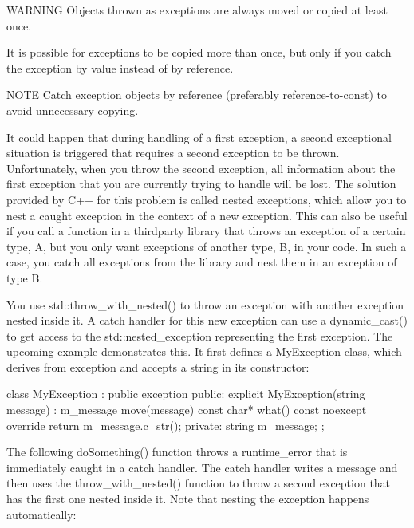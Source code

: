 \begin{myWarning}{WARNING}
Objects thrown as exceptions are always moved or copied at least once.
\end{myWarning}

It is possible for exceptions to be copied more than once, but only if you catch the exception by value instead of by reference.

\begin{myNotic}{NOTE}
Catch exception objects by reference (preferably reference-to-const) to avoid unnecessary copying.
\end{myNotic}



It could happen that during handling of a first exception, a second exceptional situation is triggered that requires a second exception to be thrown. Unfortunately, when you throw the second exception, all information about the first exception that you are currently trying to handle will be lost. The solution provided by C++ for this problem is called nested exceptions, which allow you to nest a caught exception in the context of a new exception. This can also be useful if you call a function in a thirdparty library that throws an exception of a certain type, A, but you only want exceptions of another type, B, in your code. In such a case, you catch all exceptions from the library and nest them in an exception of type B.

You use std::throw\_with\_nested() to throw an exception with another exception nested inside it. A catch handler for this new exception can use a dynamic\_cast() to get access to the std::nested\_exception representing the first exception. The upcoming example demonstrates this. It first defines a MyException class, which derives from exception and accepts a string in its constructor:

\begin{cpp}
class MyException : public exception
{
    public:
        explicit MyException(string message) : m_message { move(message) } {}
        const char* what() const noexcept override { return m_message.c_str(); }
    private:
        string m_message;
};
\end{cpp}

The following doSomething() function throws a runtime\_error that is immediately caught in a catch handler. The catch handler writes a message and then uses the throw\_with\_nested() function to throw a second exception that has the first one nested inside it. Note that nesting the exception happens automatically:

